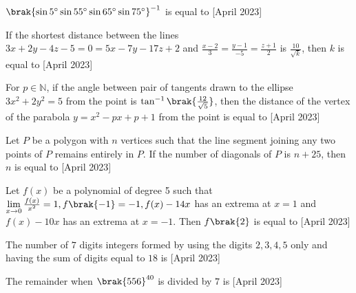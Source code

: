 \iffalse
\title{2023}
\author{EE24BTECH11066}
\section{integer}
\fi
\item $\brak{ \sin 5^\circ \sin 55^\circ \sin 65^\circ \sin 75^\circ}^{-1}$ is equal to \underline{\hspace{1cm}} \hfill{[April 2023]}\\

\item If the shortest distance between the lines \\
$3x+2y-4z-5=0=5x-7y-17z+2$ and $\frac{x-2}{3}=\frac{y-1}{-5}=\frac{z+1}{2}$ is $\frac{10}{\sqrt{k}}$, then $k$ is equal to \underline{\hspace{1cm}} \hfill{[April 2023]}\\

\item For $p \in \mathbb N$, if the angle between pair of tangents drawn to the ellipse $3x^{2}+2y^{2}=5$ from the point  is $\tan^{-1}\brak{\frac{12}{\sqrt{5}}}$, then the distance of the vertex of the parabola $y=x^2-px+p+1$ from the point  is equal to \underline{\hspace{1cm}} \hfill{[April 2023]}\\

\item Let $P$ be a polygon with $n$ vertices such that the line segment joining any two points of $P$ remains entirely in $P$. If the number of diagonals of $P$ is $n+25$, then $n$ is equal to \underline{\hspace{1cm}} \hfill{[April 2023]}\\

\item Let $f(x)$ be a polynomial of degree 5 such that $\lim\limits_{x\to 0}\frac{f(x)}{x^2}=1, f\brak{-1}=-1, f(x)-14x$ has an extrema at $x=1$ and $f(x)-10x$ has an extrema at $x=-1$. Then $f\brak{2}$ is equal to \underline{\hspace{1cm}} \hfill{[April 2023]}\\

\item The number of $7$ digits integers formed by using the digits $2,3,4,5$ only and having the sum of digits equal to $18$ is \underline{\hspace{1cm}} \hfill{[April 2023]}\\

\item The remainder when $\brak{556}^{40}$ is divided by $7$ is \underline{\hspace{1cm}} \hfill{[April 2023]}\\


